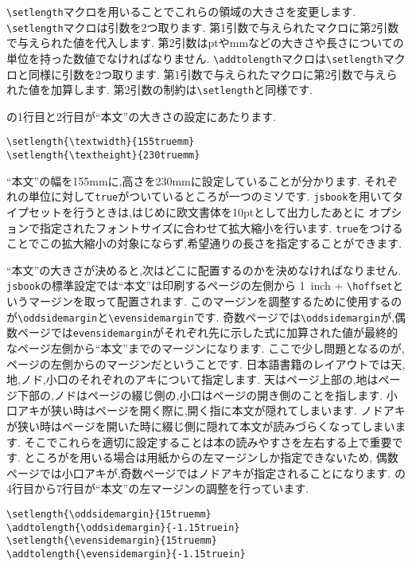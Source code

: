 \verb|\setlength|マクロを用いることでこれらの領域の大きさを変更します.
\verb|\setlength|マクロは引数を2つ取ります.
第1引数で与えられたマクロに第2引数で与えられた値を代入します.
第2引数はptやmmなどの大きさや長さについての単位を持った数値でなければなりません.
\verb|\addtolength|マクロは\verb|\setlength|マクロと同様に引数を2つ取ります.
第1引数で与えられたマクロに第2引数で与えられた値を加算します.
第2引数の制約は\verb|\setlength|と同様です.

の1行目と2行目が``本文''の大きさの設定にあたります.
\begin{verbatim}
\setlength{\textwidth}{155truemm}
\setlength{\textheight}{230truemm}
\end{verbatim}
``本文''の幅を155mmに,高さを230mmに設定していることが分かります.
それぞれの単位に対して\texttt{true}がついているところが一つのミソです.
\texttt{jsbook}を用いてタイプセットを行うときは,はじめに欧文書体を10ptとして出力したあとに
オプションで指定されたフォントサイズに合わせて拡大縮小を行います.
\texttt{true}をつけることでこの拡大縮小の対象にならず,希望通りの長さを指定することができます.

``本文''の大きさが決めると,次はどこに配置するのかを決めなければなりません.
\texttt{jsbook}の標準設定では``本文''は印刷するページの左側から
1\ inch + \verb|\hoffset|というマージンを取って配置されます.
このマージンを調整するために使用するのが\verb|\oddsidemargin|と\verb|\evensidemargin|です.
奇数ページでは\verb|\oddsidemargin|が,偶数ページでは\verb|evensidemargin|がそれぞれ先に示した式に加算された値が最終的なページ左側から``本文''までのマージンになります.
ここで少し問題となるのが,ページの左側からのマージンだということです.
日本語書籍のレイアウトでは天,地,ノド,小口のそれぞれのアキについて指定します.
天はページ上部の,地はページ下部の,ノドはページの綴じ側の,小口はページの開き側のことを指します.
小口アキが狭い時はページを開く際に,開く指に本文が隠れてしまいます.
ノドアキが狭い時はページを開いた時に綴じ側に隠れて本文が読みづらくなってしまいます.
そこでこれらを適切に設定することは本の読みやすさを左右する上で重要です.
ところが{\pLaTeX}を用いる場合は用紙からの左マージンしか指定できないため,
偶数ページでは小口アキが,奇数ページではノドアキが指定されることになります.
の4行目から7行目が``本文''の左マージンの調整を行っています.

\begin{verbatim}
\setlength{\oddsidemargin}{15truemm}
\addtolength{\oddsidemargin}{-1.15truein}
\setlength{\evensidemargin}{15truemm}
\addtolength{\evensidemargin}{-1.15truein}
\end{verbatim}

